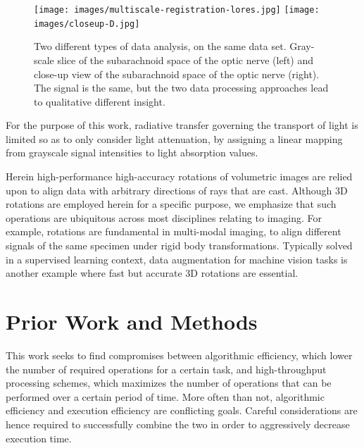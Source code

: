 \documentclass[]{usiinfbachelorproject}
\begin{document}
	\begin{figure}
		\centering
		\texttt{[image: images/multiscale-registration-lores.jpg]}
		\texttt{[image: images/closeup-D.jpg]}
		\caption{Two different types of data analysis, on the same data set. Gray-scale slice of the subarachnoid space of the optic nerve (left) and close-up view of the subarachnoid space of the optic nerve (right). The signal is the same, but the two data processing approaches lead to qualitative different insight.}
		\label{fig:closeup}
	\end{figure}
	
	For the purpose of this work, radiative transfer governing the transport of light is limited so as to only consider light attenuation, by assigning a linear mapping from grayscale signal intensities to light absorption values. 
	
	Herein high-performance high-accuracy rotations of volumetric images are relied upon to align data with arbitrary directions of rays that are cast. 
	Although 3D rotations are employed herein for a specific purpose, we emphasize that such operations are ubiquitous across most disciplines relating to imaging.
	For example, rotations are fundamental in multi-modal imaging, to align different signals of the same specimen under rigid body transformations.  
	Typically solved in a supervised learning context, data augmentation for machine vision tasks is another example where fast but accurate 3D rotations are essential.
	
	\section{Prior Work and Methods}	
	This work seeks to find compromises between algorithmic efficiency, which lower the number of required operations for a certain task, and high-throughput processing schemes, which maximizes the number of operations that can be performed over a certain period of time. More often than not, algorithmic efficiency and execution efficiency are conflicting goals. Careful considerations are hence required to successfully combine 
	the two in order to aggressively decrease execution time.
	
	
\end{document}
